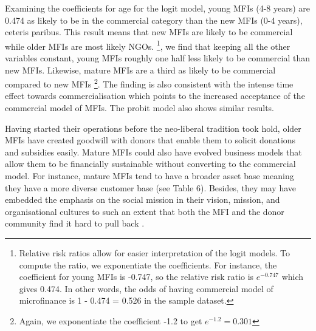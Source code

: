 \documentclass[a4paper,nobind]{templates/ociamthesis}
\begin{document}
Examining the coefficients for age for the logit model, young MFIs (4-8 years) are 0.474 as likely to be in the commercial category than the new MFIs (0-4 years), ceteris paribus. This result means that new MFIs are likely to be commercial while older MFIs are most likely NGOs. \footnote{Relative risk ratios allow for easier interpretation of the logit models. To compute the ratio, we exponentiate the coefficients. For instance, the coefficient for young MFIs is -0.747, so the relative risk ratio is \(e^{-0.747}\) which gives 0.474. In other words, the odds of having commercial model of microfinance is 1 - 0.474 = 0.526 in the sample dataset.}, we find that keeping all the other variables constant, young MFIs roughly one half less likely to be commercial than new MFIs. Likewise, mature MFIs are a third as likely to be commercial compared to new MFIs \footnote{Again, we exponentiate the coefficient -1.2 to get \(e^{-1.2} = 0.301\)}. The finding is also consistent with the intense time effect towards commercialisation which points to the increased acceptance of the commercial model of MFIs. The probit model also shows similar results.

Having started their operations before the neo-liberal tradition took hold, older MFIs have created goodwill with donors that enable them to solicit donations and subsidies easily. Mature MFIs could also have evolved business models that allow them to be financially sustainable without converting to the commercial model. For instance, mature MFIs tend to have a broader asset base meaning they have a more diverse customer base (see Table 6). Besides, they may have embedded the emphasis on the social mission in their vision, mission, and organisational cultures to such an extent that both the MFI and the donor community find it hard to pull back \autocite{ramus2017,berbegal2019impact}.
\end{document}
